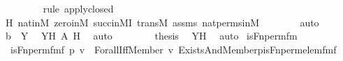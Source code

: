 \begin{isabellebody}
\ \ \ \ \ \ \ \ \isamarkupfalse%
{\isacharparenleft}{\kern0pt}rule\ apply{\isacharunderscore}{\kern0pt}closed{\isacharparenright}{\kern0pt}\isanewline
\ \ \ \ \ \ \isamarkupfalse%
\ H\ nat{\isacharunderscore}{\kern0pt}in{\isacharunderscore}{\kern0pt}M\ zero{\isacharunderscore}{\kern0pt}in{\isacharunderscore}{\kern0pt}M\ succ{\isacharunderscore}{\kern0pt}in{\isacharunderscore}{\kern0pt}MI\ transM\ assms\ nat{\isacharunderscore}{\kern0pt}perms{\isacharunderscore}{\kern0pt}in{\isacharunderscore}{\kern0pt}M\isanewline
\ \ \ \ \ \ \isamarkupfalse%
\ auto\isanewline
\ \ \ \ \isamarkupfalse%
\ \isamarkupfalse%
\ {\isachardoublequoteopen}b\ {\isasymin}\ Y{\isachardoublequoteclose}\ \isamarkupfalse%
\ YH\ {\isacartoucheopen}{\isacharquery}{\kern0pt}A{\isacartoucheclose}\ H\ \isamarkupfalse%
\ auto\isanewline
\ \ \isamarkupfalse%
\isanewline
\isanewline
\ \ \isamarkupfalse%
\ \isamarkupfalse%
\ {\isacharquery}{\kern0pt}thesis\ \isamarkupfalse%
\ YH\ \isamarkupfalse%
\ auto\isanewline
{}\isamarkupfalse%
%
\endisatagproof
{\isafoldproof}%
%
\isadelimproof
\isanewline
%
\endisadelimproof
\isanewline
{}\isamarkupfalse%
\ is{\isacharunderscore}{\kern0pt}Fn{\isacharunderscore}{\kern0pt}perm{\isacharunderscore}{\kern0pt}fm\ \ \isanewline
\ \ {\isachardoublequoteopen}is{\isacharunderscore}{\kern0pt}Fn{\isacharunderscore}{\kern0pt}perm{\isacharunderscore}{\kern0pt}fm{\isacharparenleft}{\kern0pt}f{\isacharcomma}{\kern0pt}\ p{\isacharcomma}{\kern0pt}\ v{\isacharparenright}{\kern0pt}\ {\isasymequiv}\ Forall{\isacharparenleft}{\kern0pt}Iff{\isacharparenleft}{\kern0pt}Member{\isacharparenleft}{\kern0pt}{}{\isacharcomma}{\kern0pt}\ v{\isacharhash}{\kern0pt}{\isacharplus}{\kern0pt}{}{\isacharparenright}{\kern0pt}{\isacharcomma}{\kern0pt}\ Exists{\isacharparenleft}{\kern0pt}And{\isacharparenleft}{\kern0pt}Member{\isacharparenleft}{\kern0pt}{}{\isacharcomma}{\kern0pt}p{\isacharhash}{\kern0pt}{\isacharplus}{\kern0pt}{}{\isacharparenright}{\kern0pt}{\isacharcomma}{\kern0pt}is{\isacharunderscore}{\kern0pt}Fn{\isacharunderscore}{\kern0pt}perm{\isacharunderscore}{\kern0pt}elem{\isacharunderscore}{\kern0pt}fm{\isacharparenleft}{\kern0pt}f{\isacharhash}{\kern0pt}{\isacharplus}{\kern0pt}{}{\isacharcomma}{\kern0pt}\ {}{\isacharcomma}{\kern0pt}\ {}{\isacharparenright}{\kern0pt}{\isacharparenright}{\kern0pt}{\isacharparenright}{\kern0pt}{\isacharparenright}{\kern0pt}{\isacharparenright}{\kern0pt}{\isachardoublequoteclose}\ \isanewline

\end{isabellebody}
